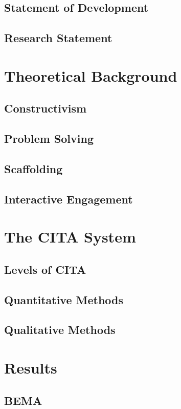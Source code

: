 \documentclass{beamer}
\begin{document}
\subsection*{Statement of Development}
\subsection*{Research Statement}

\section{Theoretical Background}

\subsection*{Constructivism}
\subsection*{Problem Solving}
\subsection*{Scaffolding}
\subsection*{Interactive Engagement}

\section{The CITA System}

\subsection*{Levels of CITA}
\subsection*{Quantitative Methods}
\subsection*{Qualitative Methods}

\section{Results}

\subsection*{BEMA}
\end{document}
